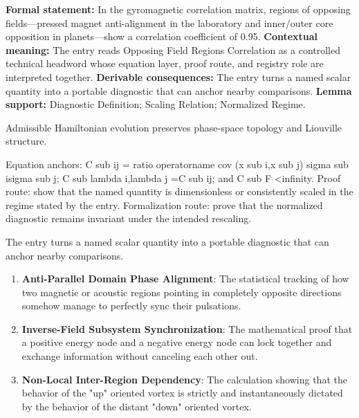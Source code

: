 \begingroup\footnotesize\setlength{\emergencystretch}{3em}\sloppy
\textbf{Formal statement:} In the gyromagnetic correlation matrix, regions of opposing fields---pressed magnet anti-alignment in the laboratory and inner/outer core opposition in planets---show a correlation coefficient of 0.95. \textbf{Contextual meaning:} The entry reads Opposing Field Regions Correlation as a controlled technical headword whose equation layer, proof route, and registry role are interpreted together. \textbf{Derivable consequences:} The entry turns a named scalar quantity into a portable diagnostic that can anchor nearby comparisons. \textbf{Lemma support:} Diagnostic Definition; Scaling Relation; Normalized Regime.\par
\endgroup

Admissible Hamiltonian evolution preserves phase-space topology and Liouville structure.

Equation anchors: C sub ij = ratio operatorname cov (x sub i,x sub j) sigma sub isigma sub j; C sub lambda i,lambda j =C sub ij; and C sub F <infinity. Proof route: show that the named quantity is dimensionless or consistently scaled in the regime stated by the entry. Formalization route: prove that the normalized diagnostic remains invariant under the intended rescaling.

The entry turns a named scalar quantity into a portable diagnostic that can anchor nearby comparisons.
\endgroup

\begin{enumerate}[leftmargin=1.6em,itemsep=6pt,topsep=4pt]
\item \textbf{Anti-Parallel Domain Phase Alignment}: The statistical tracking of how two magnetic or acoustic regions pointing in completely opposite directions somehow manage to perfectly sync their pulsations.
\item \textbf{Inverse-Field Subsystem Synchronization}: The mathematical proof that a positive energy node and a negative energy node can lock together and exchange information without canceling each other out.
\item \textbf{Non-Local Inter-Region Dependency}: The calculation showing that the behavior of the "up" oriented vortex is strictly and instantaneously dictated by the behavior of the distant "down" oriented vortex.
\end{enumerate}

